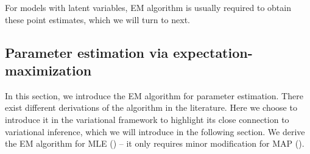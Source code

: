 For models with latent variables, \gls{EM} \citep{dempster1977maximum} algorithm is usually required to obtain these point estimates, which we will turn to next. 

\subsection{Parameter estimation via expectation-maximization}\label{chpt:background:sec:em}

In this section, we introduce the \gls{EM} algorithm for parameter estimation. There exist different derivations of the algorithm in the literature. Here we choose to introduce it in the variational framework to highlight its close connection to variational inference, which we will introduce in the following section. We derive the \gls{EM} algorithm for MLE () -- it only requires minor modification for MAP ().


